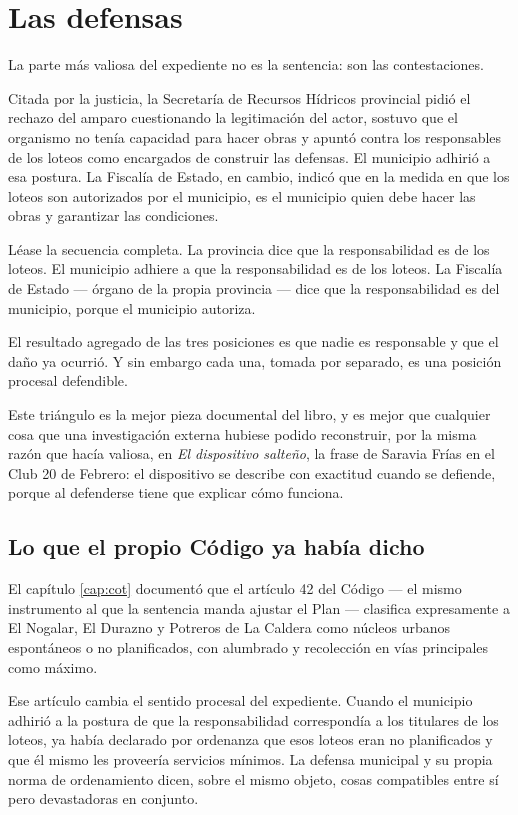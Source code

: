 \section{Las defensas}

La parte más valiosa del expediente no es la sentencia: son las contestaciones.

Citada por la justicia, la Secretaría de Recursos Hídricos provincial pidió el rechazo del amparo cuestionando la legitimación del actor, sostuvo que el organismo no tenía capacidad para hacer obras y apuntó contra los responsables de los loteos como encargados de construir las defensas. El municipio adhirió a esa postura. La Fiscalía de Estado, en cambio, indicó que en la medida en que los loteos son autorizados por el municipio, es el municipio quien debe hacer las obras y garantizar las condiciones.

Léase la secuencia completa. La provincia dice que la responsabilidad es de los loteos. El municipio adhiere a que la responsabilidad es de los loteos. La Fiscalía de Estado --- órgano de la propia provincia --- dice que la responsabilidad es del municipio, porque el municipio autoriza.

El resultado agregado de las tres posiciones es que nadie es responsable y que el daño ya ocurrió. Y sin embargo cada una, tomada por separado, es una posición procesal defendible.

Este triángulo es la mejor pieza documental del libro, y es mejor que cualquier cosa que una investigación externa hubiese podido reconstruir, por la misma razón que hacía valiosa, en \textit{El dispositivo salteño}, la frase de Saravia Frías en el Club 20 de Febrero: el dispositivo se describe con exactitud cuando se defiende, porque al defenderse tiene que explicar cómo funciona.

\subsection*{Lo que el propio Código ya había dicho}

El capítulo \ref{cap:cot} documentó que el artículo 42 del Código --- el mismo instrumento al que la sentencia manda ajustar el Plan --- clasifica expresamente a El Nogalar, El Durazno y Potreros de La Caldera como núcleos urbanos espontáneos o no planificados, con alumbrado y recolección en vías principales como máximo.

Ese artículo cambia el sentido procesal del expediente. Cuando el municipio adhirió a la postura de que la responsabilidad correspondía a los titulares de los loteos, ya había declarado por ordenanza que esos loteos eran no planificados y que él mismo les proveería servicios mínimos. La defensa municipal y su propia norma de ordenamiento dicen, sobre el mismo objeto, cosas compatibles entre sí pero devastadoras en conjunto.

